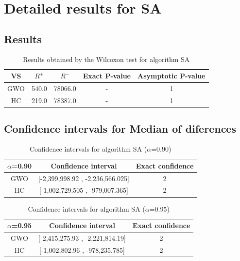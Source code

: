 \documentclass[a4paper,10pt]{article}
\begin{document}
 \clearpage 


\section{Detailed results for SA}


\subsection{Results}

\begin{table}[!htp]
\centering\small
\begin{tabular}{
|c|c|c|c|c|}
\hline
 VS & $R^{+}$ & $R^{-}$ & Exact P-value & Asymptotic P-value \\ \hline 
GWO & 540.0 & 78066.0 & - & 1\\ \hline 
HC & 219.0 & 78387.0 & - & 1\\ \hline 

\end{tabular}
\caption{Results obtained by the Wilcoxon test for algorithm SA}
\end{table}

\subsection{Confidence intervals for Median of diferences}

\begin{table}[!htp]
\centering\small
\begin{tabular}{
|c|c|c|}
\hline
 $\alpha$=0.90 & Confidence interval & Exact confidence \\ \hline 
GWO & [-2,399,998.92 , -2,236,566.025] & 2\\ \hline 
HC & [-1,002,729.505 , -979,007.365] & 2\\ \hline 

\end{tabular}
\caption{Confidence intervals for algorithm SA ($\alpha$=0.90)}
\end{table}
\begin{table}[!htp]
\centering\small
\begin{tabular}{
|c|c|c|}
\hline
 $\alpha$=0.95 & Confidence interval & Exact confidence \\ \hline 
GWO & [-2,415,275.93 , -2,221,814.19] & 2\\ \hline 
HC & [-1,002,802.96 , -978,235.785] & 2\\ \hline 

\end{tabular}
\caption{Confidence intervals for algorithm SA ($\alpha$=0.95)}
\end{table}
\end{document}
